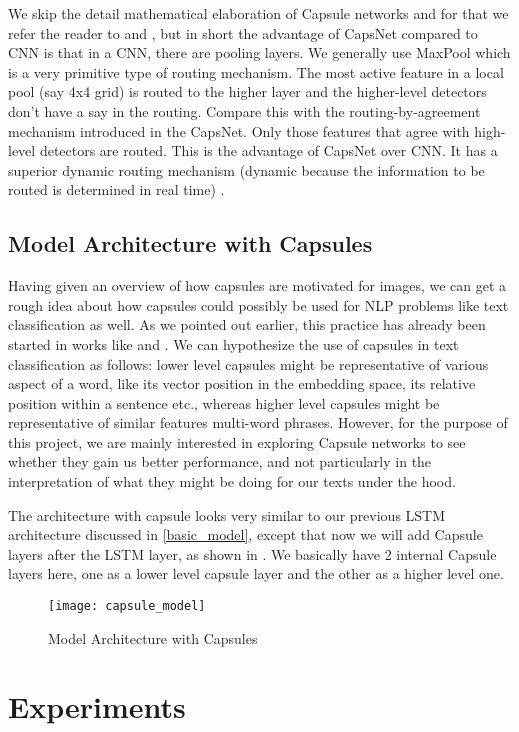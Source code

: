 \documentclass[11pt,twocolumn,letterpaper]{article}
\begin{document}
We skip the detail mathematical elaboration of Capsule networks and for that we refer the reader to \cite{capsule1} and \cite{capsule4}, but in short the advantage of CapsNet compared to CNN is that in a CNN, there are pooling layers. We generally use MaxPool which is a very primitive type of routing mechanism. The most active feature in a local pool (say 4x4 grid) is routed to the higher layer and the higher-level detectors don't have a say in the routing. Compare this with the routing-by-agreement mechanism introduced in the CapsNet. Only those features that agree with high-level detectors are routed. This is the advantage of CapsNet over CNN. It has a superior dynamic routing mechanism (dynamic because the information to be routed is determined in real time) \cite{capsule4}.

\subsection{Model Architecture with Capsules}
Having given an overview of how capsules are motivated for images, we can get a rough idea about how capsules could possibly be used for NLP problems like text classification as well. As we pointed out earlier, this practice has already been started in works like \cite{capsule2} and \cite{capsule3}. We can hypothesize the use of capsules in text classification as follows: lower level capsules might be representative of various aspect of a word, like its vector position in the embedding space, its relative position within a sentence etc., whereas higher level capsules might be representative of similar features multi-word phrases. However, for the purpose of  this project, we are mainly interested in exploring Capsule networks to see whether they gain us better performance, and not particularly in the interpretation of what they might be doing for our texts under the hood.

The architecture with capsule looks very similar to our previous LSTM architecture discussed in  \ref{basic_model}, except that now we will add Capsule layers after the LSTM layer, as shown in . We basically have 2 internal Capsule layers here, one as a lower level capsule layer and the other as a higher level one.

\begin{figure}[h]
\texttt{[image: capsule\_model]}
\caption{Model Architecture with Capsules}
\label{fig:capsule_house}
\centering
\end{figure}

\section{Experiments}
\end{document}
